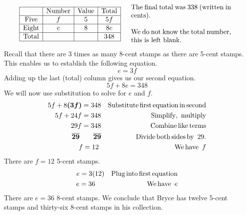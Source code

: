 \begin{example}
\begin{eqnarray*}
\begin{array}{p{0.425\textwidth}}
		\end{array}\\
		&  & \\
   \begin{array}{|c|c|c|c|}
      \hline
      & \tmop{Number} & \tmop{Value} & \tmop{Total}\\
      \hline
      \tmop{Five} & f & 5 & 5 f\\
      \hline
      \tmop{Eight} & e & 8 & 8 e\\
      \hline
      \tmop{Total} &  &  & 348\\
      \hline
    \end{array} &  & \begin{array}{p{0.425\textwidth}}
      \tmop{The} \tmop{final} \tmop{total} \tmop{was} 338 (\tmop{written}
      \tmop{in} \tmop{cents}).\pp
      \tmop{We} \tmop{do} \tmop{not} \tmop{know} \tmop{the} \tmop{total}
      \tmop{number}, \tmop{this} \tmop{is} \tmop{left} \tmop{blank}.
    \end{array}\\
 \end{eqnarray*}
Recall that there are 3 times as many 8-cent stamps as there are 5-cent stamps.  This enables us to establish the following equation.
$$e=3f$$
Adding up the last (total) column gives us our second equation.
$$5 f + 8 e = 348$$
We will now use substitution to solve for $e$ and $f$.
  \begin{eqnarray*}
    5 f + 8 \boldsymbol{(3 f)} = 348 &  & \operatorname{Substitute}
    \operatorname{first} \operatorname{equation} \operatorname{in} \operatorname{second}\\
    5 f + 24 f = 348 &  & \operatorname{Simplify,~multiply}\\
    29 f = 348 &  & \operatorname{Combine} \operatorname{like} \operatorname{terms}\\
    \boldsymbol{\overline{29} ~~~~~~ \overline{29}}  &  & \operatorname{Divide} \operatorname{both} \operatorname{sides}
    \operatorname{by~} 29.\\
    f = 12~ &  & \operatorname{We} \operatorname{have~} f
		\end{eqnarray*}
	There are $f=12$ 5-cent stamps.
	\begin{eqnarray*}
    e = 3 (12) &  & \operatorname{Plug} \operatorname{into} \operatorname{first} \operatorname{equation}\\
    e = 36~~~~ &  & \operatorname{We} \operatorname{have~} e
	\end{eqnarray*}
	There are $e=36$ 8-cent stamps.  We conclude that Bryce has twelve 5-cent stamps and thirty-six 8-cent stamps in his collection.
\end{example}

